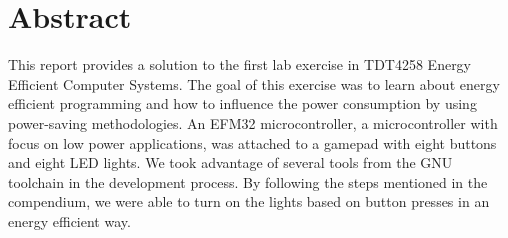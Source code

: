 \section{Abstract}

This report provides a solution to the first lab exercise in TDT4258 Energy Efficient Computer Systems.
The goal of this exercise was to learn about energy efficient programming and how to influence the power consumption by using power-saving methodologies.
An EFM32 microcontroller, a microcontroller with focus on low power applications, was attached to a gamepad with eight buttons and eight LED lights. We took advantage of several tools from the GNU toolchain in the development process. By following the steps mentioned in the compendium\cite{eeds-compendium}, we were able to turn on the lights based on button presses in an energy efficient way.
